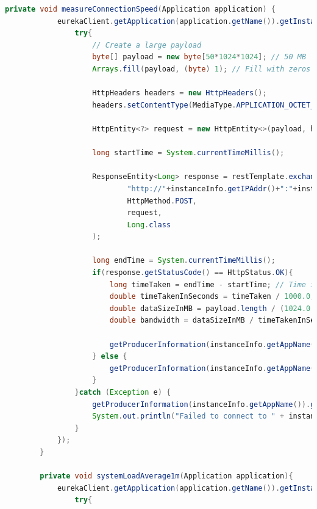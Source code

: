 \begin{lstlisting}[language=Java, caption=Kod usługi ProducerInfoService,label=ProducerInfoServiceCode]
        private void measureConnectionSpeed(Application application) {
            eurekaClient.getApplication(application.getName()).getInstances().forEach(instanceInfo -> {
                try{
                    // Create a large payload
                    byte[] payload = new byte[50*1024*1024]; // 50 MB
                    Arrays.fill(payload, (byte) 1); // Fill with zeros
    
                    HttpHeaders headers = new HttpHeaders();
                    headers.setContentType(MediaType.APPLICATION_OCTET_STREAM);
    
                    HttpEntity<?> request = new HttpEntity<>(payload, headers);
    
                    long startTime = System.currentTimeMillis();
    
                    ResponseEntity<Long> response = restTemplate.exchange(
                            "http://"+instanceInfo.getIPAddr()+":"+instanceInfo.getPort()+"/connectionSpeed",
                            HttpMethod.POST,
                            request,
                            Long.class
                    );
    
                    long endTime = System.currentTimeMillis();
                    if(response.getStatusCode() == HttpStatus.OK){
                        long timeTaken = endTime - startTime; // Time in milliseconds
                        double timeTakenInSeconds = timeTaken / 1000.0;
                        double dataSizeInMB = payload.length / (1024.0 * 1024.0);
                        double bandwidth = dataSizeInMB / timeTakenInSeconds; // MB/s
    
                        getProducerInformation(instanceInfo.getAppName()).getMeasurementBufferConnectionSpeed().addMeasurement(bandwidth);
                    } else {
                        getProducerInformation(instanceInfo.getAppName()).getMeasurementBufferConnectionSpeed().addMeasurement(Double.MAX_VALUE);
                    }
                }catch (Exception e) {
                    getProducerInformation(instanceInfo.getAppName()).getMeasurementBufferConnectionSpeed().addMeasurement(Double.MAX_VALUE);
                    System.out.println("Failed to connect to " + instanceInfo.getIPAddr() + ":" + instanceInfo.getPort() + "-> "+e.getMessage());
                }
            });
        }
    
        private void systemLoadAverage1m(Application application){
            eurekaClient.getApplication(application.getName()).getInstances().forEach(instanceInfo -> {
                try{
    

\end{lstlisting}
